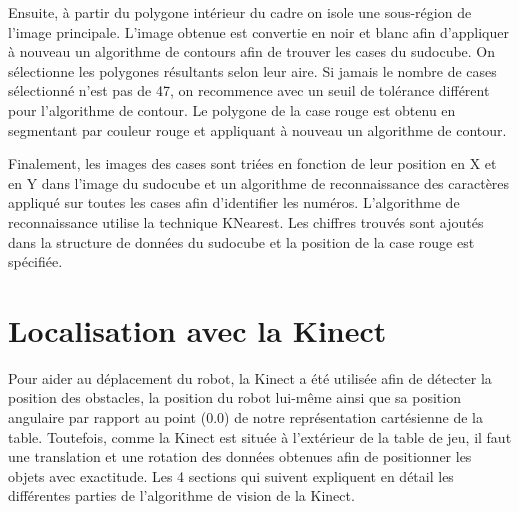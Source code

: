 Ensuite, à partir du polygone intérieur du cadre on isole une sous-région de l'image principale. L'image obtenue est convertie en noir et blanc afin d'appliquer à nouveau un algorithme de contours afin de trouver les cases du sudocube. On sélectionne les polygones résultants selon leur aire. Si jamais le nombre de cases sélectionné n'est pas de 47, on recommence avec un seuil de tolérance différent pour l'algorithme de contour. Le polygone de la case rouge est obtenu en segmentant par couleur rouge et appliquant à nouveau un algorithme de contour. 

Finalement, les images des cases sont triées en fonction de leur position en X et en Y dans l'image du sudocube et un algorithme de reconnaissance des caractères appliqué sur toutes les cases afin d'identifier les numéros. L'algorithme de reconnaissance utilise la technique KNearest. Les chiffres trouvés sont ajoutés dans la structure de données du sudocube et la position de la case rouge est spécifiée.

\section{Localisation avec la Kinect}

Pour aider au déplacement du robot, la Kinect a été utilisée afin de détecter la position des obstacles, la position du robot lui-même ainsi que sa position angulaire par rapport au point (0.0) de notre représentation cartésienne de la table. Toutefois, comme la Kinect est située à l'extérieur de la table de jeu, il faut une translation et une rotation des données obtenues afin de positionner les objets avec exactitude. Les 4 sections qui suivent expliquent en détail les différentes parties de l'algorithme de vision de la Kinect.

